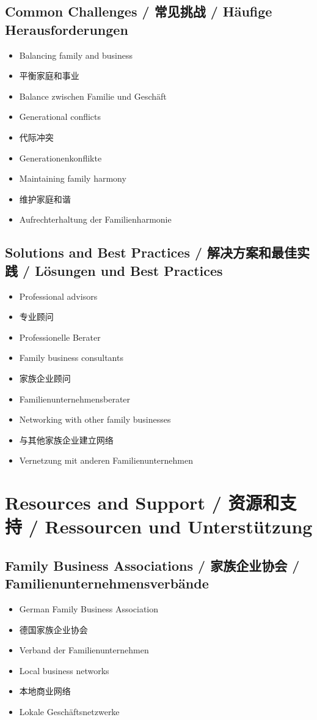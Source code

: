 \subsection{Common Challenges / 常见挑战 / Häufige Herausforderungen}
\begin{itemize}
    \item Balancing family and business
    \item 平衡家庭和事业
    \item Balance zwischen Familie und Geschäft
    \item Generational conflicts
    \item 代际冲突
    \item Generationenkonflikte
    \item Maintaining family harmony
    \item 维护家庭和谐
    \item Aufrechterhaltung der Familienharmonie
\end{itemize}

\subsection{Solutions and Best Practices / 解决方案和最佳实践 / Lösungen und Best Practices}
\begin{itemize}
    \item Professional advisors
    \item 专业顾问
    \item Professionelle Berater
    \item Family business consultants
    \item 家族企业顾问
    \item Familienunternehmensberater
    \item Networking with other family businesses
    \item 与其他家族企业建立网络
    \item Vernetzung mit anderen Familienunternehmen
\end{itemize}

\section{Resources and Support / 资源和支持 / Ressourcen und Unterstützung}

\subsection{Family Business Associations / 家族企业协会 / Familienunternehmensverbände}
\begin{itemize}
    \item German Family Business Association
    \item 德国家族企业协会
    \item Verband der Familienunternehmen
    \item Local business networks
    \item 本地商业网络
    \item Lokale Geschäftsnetzwerke
\end{itemize}

